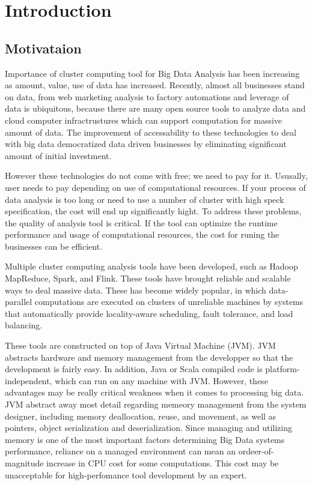 \chapter{Introduction}
\label{chapter:Introduction}
\thispagestyle{myheadings}


\section{Motivataion}
\label{sec:history}
Importance of cluster computing tool for Big Data Analysis has been increasing as amount, value, use of data has increased. 
Recently, almost all businesses stand on data, from web marketing analysis to factory automations and leverage of data is ubiquitous, because 
there are many open source tools to analyze data and cloud computer infractrustures which can support computation for massive amount of data. 
The improvement of accessability to these technologies to deal with big data democratized data driven businesses by 
eliminating significant amount of initial investment. 

However these technologies do not come with free; we need to pay for it. Ususally, user needs to pay depending on use of computational resources. 
If your process of data analysis is too long or need to use a number of cluster with high speck specification, the cost will end up significantly hight.
To address these problems, the quality of analysis tool is critical. If the tool can optimize the runtime performance and usage of computational resources, 
the cost for runing the businesses can be efficient.

Multiple cluster computing analysis tools have been developed, such as Hadoop MapReduce, Spark, and Flink. These tools have brought reliable and scalable ways to deal massive data. 
These has become widely popular, in which data-parallel computations are executed on clusters of unreliable machines by systems that automatically provide locality-aware scheduling, 
fault tolerance, and load balancing. 

These tools are constructed on top of Java Virtual Machine (JVM). JVM abstracts hardware and memory management from the developper so that the development is fairly easy. 
In addition, Java or Scala compiled code is platform-independent, which can run on any machine with JVM. However, these advantages may be really critical weakness when it comes to 
processing big data. JVM abstract away most detail regarding memeory management from the system designer, including memory deallocation, reuse, and movement, as well as pointers, 
object serialization and deserialization. Since managing and utilizing memory is one of the most important factors determining Big Data systems performance, 
reliance on a managed environment can mean an ordeer-of-magnitude increase in CPU cost for some computations. This cost may be unacceptable for high-perfomance tool development by an expert.


